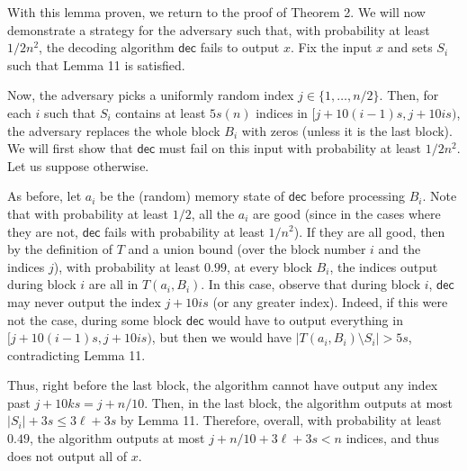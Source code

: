 With this lemma proven, we return to the proof of Theorem 2. We will now demonstrate a strategy for the adversary such that, with probability at least $1/2n^{2}$, the decoding algorithm $\mathsf{dec}$ fails to output $x$. Fix the input $x$ and sets $S_{i}$ such that Lemma 11 is satisfied.\par




Now, the adversary picks a uniformly random index $j\in\{1,\dots,n/2\}$. Then, for each $i$ such that $S_{i}$ contains at least $5s(n)$ indices in $[j+10(i-1)s,j+10is)$, the adversary replaces the whole block $B_{i}$ with zeros (unless it is the last block). We will first show that $\mathsf{dec}$ must fail on this input with probability at least $1/2n^{2}$. Let us suppose otherwise.\par




As before, let $a_{i}$ be the (random) memory state of $\mathsf{dec}$ before processing $B_{i}$. Note that with probability at least $1/2$, all the $a_{i}$ are good (since in the cases where they are not, $\mathsf{dec}$ fails with probability at least $1/n^{2}$). If they are all good, then by the definition of $T$ and a union bound (over the block number $i$ and the indices $j$), with probability at least $0.99$, at every block $B_{i}$, the indices output during block $i$ are all in $T(a_{i},B_{i})$. In this case, observe that during block $i$, $\mathsf{dec}$ may never output the index $j+10is$ (or any greater index). Indeed, if this were not the case, during some block $\mathsf{dec}$ would have to output everything in $[j+10(i-1)s,j+10is)$, but then we would have $|T(a_{i},B_{i})\setminus S_{i}|>5s$, contradicting Lemma 11.\par




Thus, right before the last block, the algorithm cannot have output any index past $j+10ks=j+n/10$. Then, in the last block, the algorithm outputs at most $|S_{i}|+3s\leq 3\ell+3s$ by Lemma 11. Therefore, overall, with probability at least $0.49$, the algorithm outputs at most $j+n/10+3\ell+3s<n$ indices, and thus does not output all of $x$.\par




